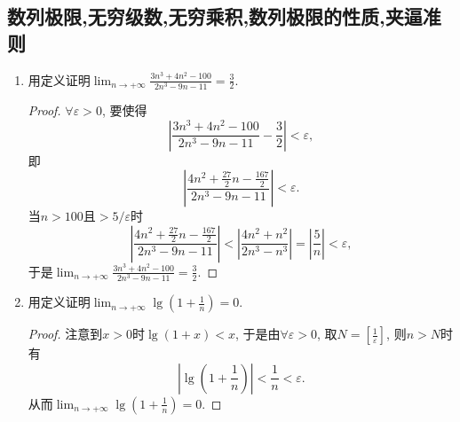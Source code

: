 \subsection{数列极限,无穷级数,无穷乘积,数列极限的性质,夹逼准则}
\begin{1a}
\begin{enumerate}
\item  用定义证明\(\lim_{n\rightarrow +\infty}\frac{3n^3+4n^2-100}{2n^3-9n-11}=\frac{3}{2}.\)
\begin{proof}
\(\forall \varepsilon >0\), 要使得
\[\left|\frac{3n^3+4n^2-100}{2n^3-9n-11}-\frac{3}{2}\right|<\varepsilon,\]
即\[\left|\frac{4n^2+\frac{27}{2}n-\frac{167}{2}}{2n^3-9n-11}\right|<\varepsilon.\]
当\(n>100\)且\(>5/\varepsilon\)时
\[\left|\frac{4n^2+\frac{27}{2}n-\frac{167}{2}}{2n^3-9n-11}\right|
<\left|\frac{4n^2+n^2}{2n^3-n^3}\right|=\left|\frac{5}{n}\right|<\varepsilon,\]
于是\(\lim_{n\rightarrow +\infty}\frac{3n^3+4n^2-100}{2n^3-9n-11}=\frac{3}{2}.\)
\end{proof}
\item 用定义证明\(\lim_{n\rightarrow +\infty}\lg \left(1+\frac{1}{n}\right)=0.\)
\begin{proof}
注意到\(x>0\)时\(\lg(1+x)<x\), 于是由\(\forall \varepsilon>0\), 
取\(N=\left[\frac{1}{\varepsilon}\right]\), 则\(n>N\)时有
\[\left|\lg\left(1+\frac{1}{n}\right)\right|<\frac{1}{n}<\varepsilon.\]
从而\(\lim_{n\rightarrow +\infty}\lg \left(1+\frac{1}{n}\right)=0.\)
\end{proof}
\end{enumerate}
\end{1a}
